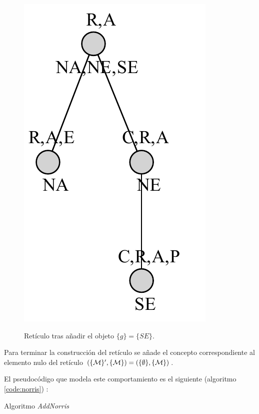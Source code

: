 \documentclass[oneside,openright,titlepage,numbers=noenddot,openany,headinclude,footinclude=true,
cleardoublepage=empty,abstractoff,BCOR=5mm,paper=a4,fontsize=12pt,main=spanish]{scrreprt}
\begin{document}
\begin{figure}[H]
  \centering
  \includegraphics[scale=0.7]{images/paso3norris.pdf}
  \label{fig:test2}
\caption{Retículo tras añadir el objeto $\{g\}=\{SE\}$.}
\end{figure}

Para terminar la construcción del retículo se añade el concepto correspondiente al elemento nulo del retículo $(\{\mathcal{M}\}',\{\mathcal{M}\})= (\{\emptyset\},\{\mathcal{M}\})$.

El pseudocódigo \cite{comparingperformance} que modela este comportamiento es el siguiente (algoritmo \ref{code:norris}) :

\begin{algorithm}[H]
\caption{Algoritmo \textit{AddNorris}}
\label{code:norris}
     
    
\end{algorithm}
\end{document}
